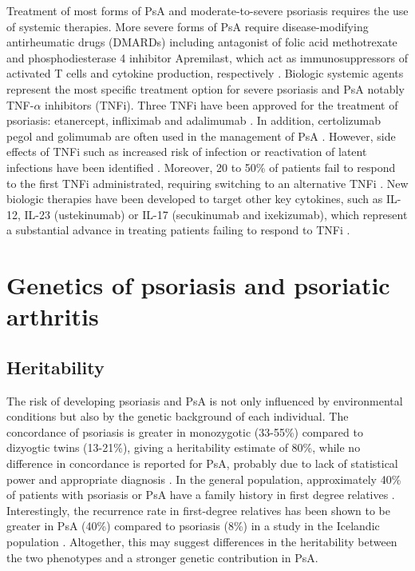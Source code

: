 Treatment of most forms of PsA and moderate-to-severe psoriasis requires the use of systemic therapies. More severe forms of PsA require disease-modifying antirheumatic drugs (DMARDs) including antagonist of folic acid methotrexate and phosphodiesterase 4 inhibitor Apremilast, which act as immunosuppressors of activated T cells and cytokine production, respectively \parencite{Schmitt2014, Gossec2016, Keating2017,Polachek2017}. Biologic systemic agents represent the most specific treatment option for severe psoriasis and PsA notably TNF-$\alpha$ inhibitors (TNFi). Three TNFi have been approved for the treatment of psoriasis: etanercept, infliximab and adalimumab \parencite{Mahil2016}. In addition, certolizumab pegol and golimumab are often used in the management of PsA \parencite{Coates2016a}. However, side effects of TNFi such as increased risk of infection or reactivation of latent infections have been identified \parencite{Gottlieb2003}. Moreover, 20 to 50\% of patients fail to respond to the first TNFi administrated, requiring switching to an alternative TNFi \parencite{Abramson2016}. New biologic therapies have been developed to target other key cytokines, such as IL-12, IL-23 (ustekinumab) or IL-17 (secukinumab and ixekizumab), which represent a substantial advance in treating patients failing to respond to TNFi \parencite{Mahil2016, Coates2016a}.


 

\section{Genetics of psoriasis and psoriatic arthritis}

\subsection{Heritability}

The risk of developing psoriasis and PsA is not only influenced by environmental conditions but also by the genetic background of each individual. The concordance of psoriasis is greater in monozygotic (33-55\%) compared to dizyogtic twins (13-21\%), giving a heritability estimate of 80\%, while no difference in concordance is reported for PsA, probably due to lack of statistical power and appropriate diagnosis \parencite{Farber1974, Duffy1993, Pedersen2008}. In the general population, approximately 40\% of patients with psoriasis or PsA have a family history in first degree relatives \parencite{Gladman1986}. Interestingly, the recurrence rate in first-degree relatives has been shown to be greater in PsA (40\%) compared to psoriasis (8\%) in a study in the Icelandic population \parencite{Chandran2009}. Altogether, this may suggest differences in the heritability between the two phenotypes and a stronger genetic contribution in PsA.




